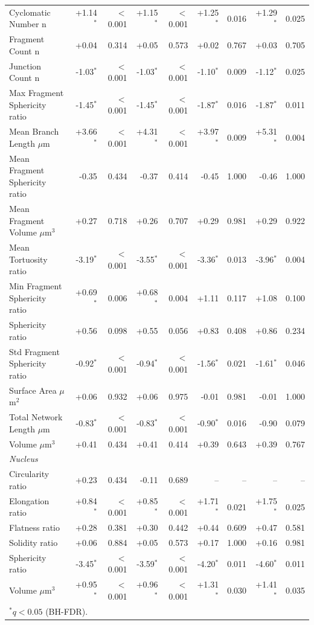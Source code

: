 \documentclass[11pt,a4paper]{article}
\begin{document}
\begin{longtable}{lrrrrrrrr}
  Cyclomatic Number n & +1.14$^{*}$ & $<$0.001 & +1.15$^{*}$ & $<$0.001 & +1.25$^{*}$ & 0.016 & +1.29$^{*}$ & 0.025 \\
  Fragment Count n & +0.04 & 0.314 & +0.05 & 0.573 & +0.02 & 0.767 & +0.03 & 0.705 \\
  Junction Count n & -1.03$^{*}$ & $<$0.001 & -1.03$^{*}$ & $<$0.001 & -1.10$^{*}$ & 0.009 & -1.12$^{*}$ & 0.025 \\
  Max Fragment Sphericity ratio & -1.45$^{*}$ & $<$0.001 & -1.45$^{*}$ & $<$0.001 & -1.87$^{*}$ & 0.016 & -1.87$^{*}$ & 0.011 \\
  Mean Branch Length $\mu$m & +3.66$^{*}$ & $<$0.001 & +4.31$^{*}$ & $<$0.001 & +3.97$^{*}$ & 0.009 & +5.31$^{*}$ & 0.004 \\
  Mean Fragment Sphericity ratio & -0.35 & 0.434 & -0.37 & 0.414 & -0.45 & 1.000 & -0.46 & 1.000 \\
  Mean Fragment Volume $\mu$m$^{3}$ & +0.27 & 0.718 & +0.26 & 0.707 & +0.29 & 0.981 & +0.29 & 0.922 \\
  Mean Tortuosity ratio & -3.19$^{*}$ & $<$0.001 & -3.55$^{*}$ & $<$0.001 & -3.36$^{*}$ & 0.013 & -3.96$^{*}$ & 0.004 \\
  Min Fragment Sphericity ratio & +0.69$^{*}$ & 0.006 & +0.68$^{*}$ & 0.004 & +1.11 & 0.117 & +1.08 & 0.100 \\
  Sphericity ratio & +0.56 & 0.098 & +0.55 & 0.056 & +0.83 & 0.408 & +0.86 & 0.234 \\
  Std Fragment Sphericity ratio & -0.92$^{*}$ & $<$0.001 & -0.94$^{*}$ & $<$0.001 & -1.56$^{*}$ & 0.021 & -1.61$^{*}$ & 0.046 \\
  Surface Area $\mu$m$^{2}$ & +0.06 & 0.932 & +0.06 & 0.975 & -0.01 & 0.981 & -0.01 & 1.000 \\
  Total Network Length $\mu$m & -0.83$^{*}$ & $<$0.001 & -0.83$^{*}$ & $<$0.001 & -0.90$^{*}$ & 0.016 & -0.90 & 0.079 \\
  Volume $\mu$m$^{3}$ & +0.41 & 0.434 & +0.41 & 0.414 & +0.39 & 0.643 & +0.39 & 0.767 \\
\midrule
\multicolumn{9}{l}{\textit{Nucleus}} \\
  Circularity ratio & +0.23 & 0.434 & -0.11 & 0.689 & -- & -- & -- & -- \\
  Elongation ratio & +0.84$^{*}$ & $<$0.001 & +0.85$^{*}$ & $<$0.001 & +1.71$^{*}$ & 0.021 & +1.75$^{*}$ & 0.025 \\
  Flatness ratio & +0.28 & 0.381 & +0.30 & 0.442 & +0.44 & 0.609 & +0.47 & 0.581 \\
  Solidity ratio & +0.06 & 0.884 & +0.05 & 0.573 & +0.17 & 1.000 & +0.16 & 0.981 \\
  Sphericity ratio & -3.45$^{*}$ & $<$0.001 & -3.59$^{*}$ & $<$0.001 & -4.20$^{*}$ & 0.011 & -4.60$^{*}$ & 0.011 \\
  Volume $\mu$m$^{3}$ & +0.95$^{*}$ & $<$0.001 & +0.96$^{*}$ & $<$0.001 & +1.31$^{*}$ & 0.030 & +1.41$^{*}$ & 0.035 \\
\bottomrule
\multicolumn{9}{l}{\footnotesize $^{*}q < 0.05$ (BH-FDR).} \\
\end{longtable}
\end{document}
